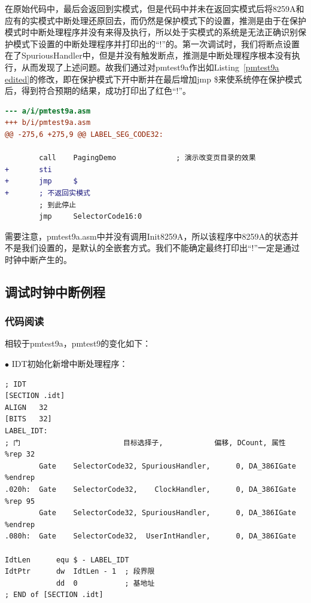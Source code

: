 \documentclass[UTF8,12pt]{ctexart}
\begin{document}

    在原始代码中，最后会返回到实模式，但是代码中并未在返回实模式后将8259A和应有的实模式中断处理还原回去，而仍然是保护模式下的设置，推测是由于在保护模式时中断处理程序并没有来得及执行，所以处于实模式的系统是无法正确识别保护模式下设置的中断处理程序并打印出的“!”的。第一次调试时，我们将断点设置在了SpuriousHandler中，但是并没有触发断点，推测是中断处理程序根本没有执行，从而发现了上述问题。故我们通过对pmtest9a作出如Listing~\ref{pmtest9a edited}的修改，即在保护模式下开中断并在最后增加jmp \$来使系统停在保护模式后，得到符合预期的结果，成功打印出了红色“!”。
    
    \begin{lstlisting}[language=diff, caption={使pmtest9a能正常显示叹号}, label={pmtest9a edited}]
--- a/i/pmtest9a.asm
+++ b/i/pmtest9a.asm
@@ -275,6 +275,9 @@ LABEL_SEG_CODE32:
 
        call    PagingDemo              ; 演示改变页目录的效果 
+       sti
+       jmp     $
+       ; 不返回实模式        
        ; 到此停止
        jmp     SelectorCode16:0

    \end{lstlisting}
    
    需要注意，pmtest9a.asm中并没有调用Init8259A，所以该程序中8259A的状态并不是我们设置的，是默认的全嵌套方式。我们不能确定最终打印出“!”一定是通过时钟中断产生的。
    
    \subsection{调试时钟中断例程\label{调试时钟中断}}
    \subsubsection{代码阅读}
    相较于pmtest9a，pmtest9的变化如下：
    
    $\bullet$ IDT初始化新增中断处理程序：
    
    \begin{lstlisting}[language={[x86masm]Assembler}]
; IDT
[SECTION .idt]
ALIGN	32
[BITS	32]
LABEL_IDT:
; 门                        目标选择子,            偏移, DCount, 属性
%rep 32
        Gate	SelectorCode32, SpuriousHandler,      0, DA_386IGate
%endrep
.020h:  Gate	SelectorCode32,    ClockHandler,      0, DA_386IGate
%rep 95
        Gate	SelectorCode32, SpuriousHandler,      0, DA_386IGate
%endrep
.080h:  Gate	SelectorCode32,  UserIntHandler,      0, DA_386IGate

IdtLen      equ	$ - LABEL_IDT
IdtPtr      dw	IdtLen - 1  ; 段界限
            dd	0           ; 基地址
; END of [SECTION .idt]
    \end{lstlisting}
    
\end{document}
